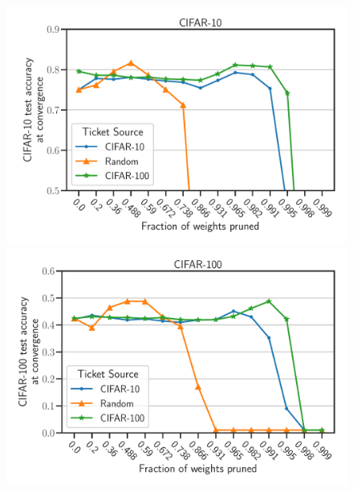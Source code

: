     \begin{figure}[h]
        \centering
        \begin{minipage}{.497\textwidth}
        \includegraphics[width=\textwidth]{../openreview/plots/Exp2_ResNet_CIFAR10_N.pdf}
        \end{minipage}
        \begin{minipage}{.497\textwidth}
        \includegraphics[width=\textwidth]{../openreview/plots/Exp2_ResNet_CIFAR100_N.pdf}

\end{minipage}
\end{figure}

